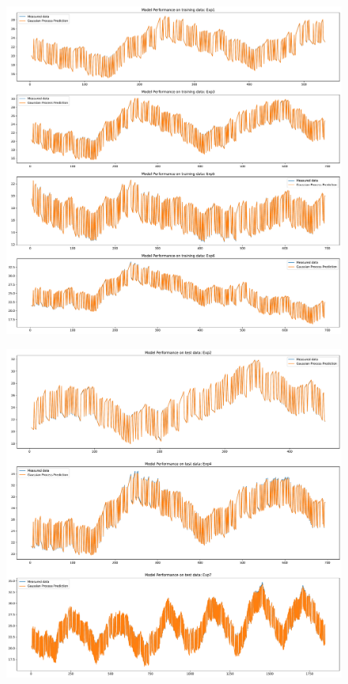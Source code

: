 \begin{figure}[ht]
    \centering
    \includegraphics[width = \textwidth]{Plots/SVGP_123_training_performance.pdf}
    \caption{}
    \label{fig:SVGP_train_validation}
\end{figure}

\begin{figure}[ht]
    \centering
    \includegraphics[width = \textwidth]{Plots/SVGP_123_test_performance.pdf}
    \caption{}
    \label{fig:SVGP_test_validation}
\end{figure}

